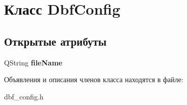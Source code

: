 \hypertarget{class_dbf_config}{\section{Класс \-Dbf\-Config}
\label{class_dbf_config}
}
\subsection*{Открытые атрибуты}
\begin{DoxyCompactItemize}
\item 
\hypertarget{class_dbf_config_a470166ad623d0c27857705d347f9866a}{\-Q\-String {\bfseries file\-Name}}\label{class_dbf_config_a470166ad623d0c27857705d347f9866a}

\end{DoxyCompactItemize}


Объявления и описания членов класса находятся в файле\-:\begin{DoxyCompactItemize}
\item 
dbf\-\_\-config.\-h\end{DoxyCompactItemize}
